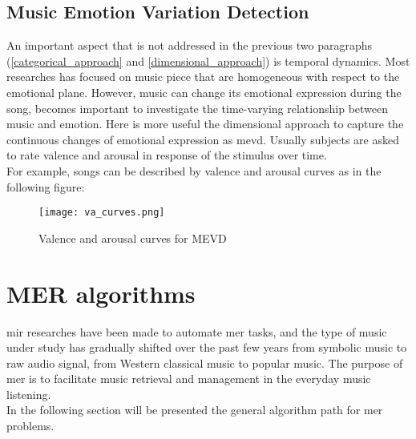 \subsection{Music Emotion Variation Detection}
An important aspect that is not addressed in the previous two paragraphs (\ref{categorical_approach} and \ref{dimensional_approach}) is temporal dynamics. Most researches has focused on music piece that are homogeneous with respect to the emotional plane. However, music can change its emotional expression during the song, becomes important to investigate the time-varying relationship between music and emotion. Here is more useful the dimensional approach to capture the continuous changes of emotional expression as \gls{mevd}. Usually subjects are asked to rate valence and arousal in response of the stimulus over time.
\\
For example, songs can be described by valence and arousal curves as in the following figure:
\begin{figure}[h]
    \centering
    \texttt{[image: va\_curves.png]} 
	\caption{Valence and arousal curves for MEVD}
    \label{fig:va_curves}
\end{figure}

\section{MER algorithms}
\gls{mir} researches have been made to automate \gls{mer} tasks, and the type of music under study has gradually shifted over the past few years from symbolic music to raw audio signal, from Western classical music to popular music. The purpose of \gls{mer} is to facilitate music retrieval and management in the everyday music listening.
\\
In the following section will be presented the general algorithm path for \gls{mer} problems.

